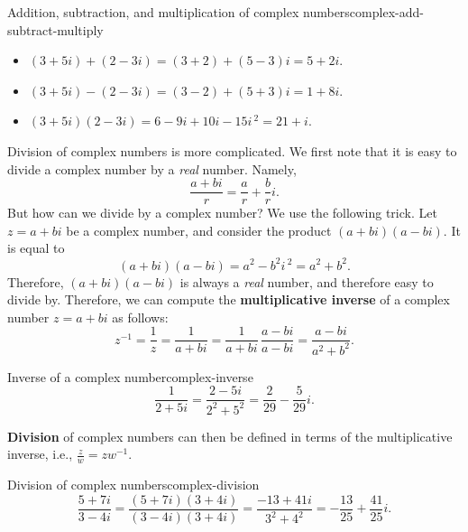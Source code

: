 \begin{example}{Addition, subtraction, and multiplication of complex numbers}{complex-add-subtract-multiply}
  \begin{itemize}
  \item $(3+5i) + (2-3i) = (3+2) + (5-3)i         = 5 + 2i$.
  \item $(3+5i) - (2-3i) = (3-2) + (5+3)i         = 1 + 8i$.
  \item $(3+5i) (2-3i)   = 6 - 9i + 10i - 15i\,^2 = 21 + i$.
  \end{itemize}
\end{example}

Division of complex numbers is more complicated. We first note that it
is easy to divide a complex number by a {\em real} number. Namely,
\begin{equation*}
  \frac{a+bi}{r} = \frac{a}{r} + \frac{b}{r}i.
\end{equation*}
But how can we divide by a complex number? We use the following
trick. Let $z=a+bi$ be a complex number, and consider the product
$(a+bi)(a-bi)$. It is equal to
\begin{equation*}
  (a+bi)(a-bi) = a^2 - b^2i\,^2 = a^2+b^2.
\end{equation*}
Therefore, $(a+bi)(a-bi)$ is always a {\em real} number, and therefore
easy to divide by. Therefore, we can compute the
\textbf{multiplicative inverse}%
%
%
 of a complex number $z=a+bi$ as
follows:
\begin{equation*}
  z^{-1}
  = \frac{1}{z}
  = \frac{1}{a+bi}
  = \frac{1}{a+bi}\,\frac{a-bi}{a-bi}=\frac{a-bi}{a^{2}+b^{2}}.
\end{equation*}

\begin{example}{Inverse of a complex number}{complex-inverse}
  \begin{equation*}
    \frac{1}{2+5i}
    = \frac{2-5i}{2^2+5^2}
    = \frac{2}{29} - \frac{5}{29}i.
  \end{equation*}
\end{example}

\textbf{Division}%
 of complex numbers can then be
defined in terms of the multiplicative inverse, i.e.,
$\frac{z}{w} = zw^{-1}$.

\begin{example}{Division of complex numbers}{complex-division}
  \begin{equation*}
    \frac{5+7i}{3-4i}
    = \frac{(5+7i)(3+4i)}{(3-4i)(3+4i)}
    = \frac{-13+41i}{3^2+4^2}
    = -\frac{13}{25} + \frac{41}{25}i.
  \end{equation*}
\end{example}

